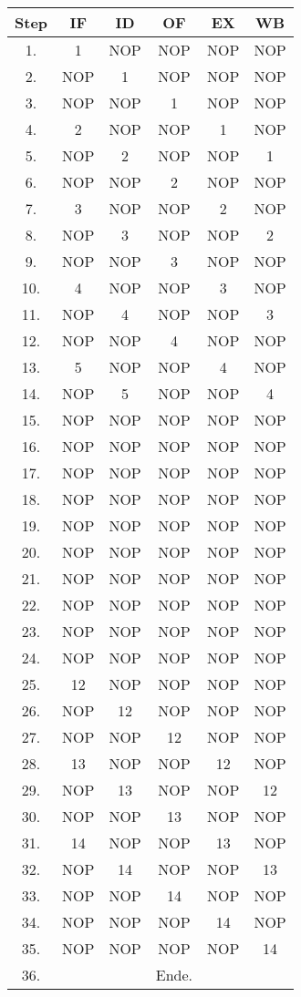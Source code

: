 \documentclass[11pt]{article}
\begin{document}
\begin{center}
\begin{tabular}{c|c|c|c|c|c}
    Step & IF & ID & OF & EX & WB \\
    \hline
    1. & 1 & NOP & NOP & NOP & NOP \\
    2. & NOP & 1 & NOP & NOP & NOP \\
    3. & NOP & NOP & 1 & NOP & NOP \\
    4. & 2 & NOP & NOP & 1 & NOP \\
    5. & NOP & 2 & NOP & NOP & 1 \\
    6. & NOP & NOP & 2 & NOP & NOP \\
    7. & 3 & NOP & NOP & 2 & NOP \\
    8. & NOP & 3 & NOP & NOP & 2\\
    9. & NOP & NOP & 3 & NOP & NOP \\
    10. & 4 & NOP & NOP & 3 & NOP \\
    11. & NOP & 4 & NOP & NOP & 3 \\
    12. & NOP & NOP & 4 & NOP & NOP \\
    13. & 5 & NOP & NOP & 4 & NOP \\
    14. & NOP & 5 & NOP & NOP & 4 \\
    15. & NOP & NOP & NOP & NOP & NOP \\
    16. & NOP & NOP & NOP & NOP & NOP \\
    17. & NOP & NOP & NOP & NOP & NOP \\
    18. & NOP & NOP & NOP & NOP & NOP \\
    19. & NOP & NOP & NOP & NOP & NOP \\
    20. & NOP & NOP & NOP & NOP & NOP \\
    21. & NOP & NOP & NOP & NOP & NOP \\
    22. & NOP & NOP & NOP & NOP & NOP \\
    23. & NOP & NOP & NOP & NOP & NOP \\
    24. & NOP & NOP & NOP & NOP & NOP \\
    25. & 12 & NOP & NOP & NOP & NOP \\
    26. & NOP & 12 & NOP & NOP & NOP \\
    27. & NOP & NOP & 12 & NOP & NOP \\
    28. & 13 & NOP & NOP & 12 & NOP \\
    29. & NOP & 13 & NOP & NOP & 12 \\
    30. & NOP & NOP & 13 & NOP & NOP \\
    31. & 14 & NOP & NOP & 13 & NOP \\
    32. & NOP & 14 & NOP & NOP & 13 \\
    33. & NOP & NOP & 14 & NOP & NOP \\
    34. & NOP & NOP & NOP & 14 & NOP \\
    35. & NOP & NOP & NOP & NOP & 14 \\
    36. &  &  & Ende. &  & 
\end{tabular}
\end{center}
\end{document}
